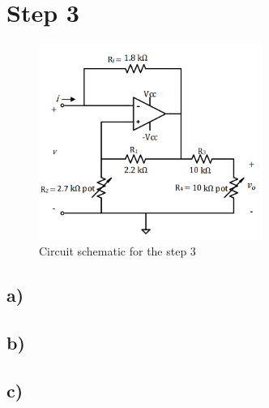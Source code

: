 \documentclass[letterpaper,12pt]{article}
\begin{document}
\section{Step 3}


\begin{figure}[H]
    \centering
    \includegraphics[width=0.65\textwidth]{3SCH.png}
\caption{Circuit schematic for the step 3}
\end{figure} 

\subsection{a)}
\subsection{b)}
\subsection{c)}
\end{document}
